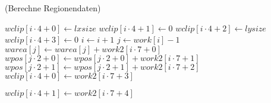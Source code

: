 \begin{algorithm}[ht]
\caption{ (Berechne Regionendaten)}
\label{alg:arlabeling-calcregiondata}
\begin{algorithmic}[1]
	\label{alg:arlabeling-calcregiondata-wclip-start}
		\State $\mathit{wclip}\left[i \cdot 4 + 0\right] \gets \mathit{lxsize}$
		\State $\mathit{wclip}\left[i \cdot 4 + 1\right] \gets 0$
		\State $\mathit{wclip}\left[i \cdot 4 + 2\right] \gets \mathit{lysize}$
		\State $\mathit{wclip}\left[i \cdot 4 + 3\right] \gets 0$
		\State $i \gets i + 1$
	\EndFor
	\label{alg:arlabeling-calcregiondata-wclip-end}
	\label{alg:arlabeling-calcregiondata-work-start}
		\State $j \gets \mathit{work}\left[i\right] - 1$
		\label{alg:arlabeling-calcregiondata-label}
		\State $\mathit{warea}\left[j\right] \gets \mathit{warea}\left[j\right] + \mathit{work2}\left[i \cdot 7 + 0\right]$
		\State $\mathit{wpos}\left[j \cdot 2 + 0\right] \gets \mathit{wpos}\left[j \cdot 2 + 0\right] + \mathit{work2}\left[i \cdot 7 + 1\right]$
		\label{alg:arlabeling-calcregiondata-sumx}
		\State $\mathit{wpos}\left[j \cdot 2 + 1\right] \gets \mathit{wpos}\left[j \cdot 2 + 1\right] + \mathit{work2}\left[i \cdot 7 + 2\right]$
		\label{alg:arlabeling-calcregiondata-sumy}
		\label{alg:arlabeling-calcregiondata-startx-start}
			\State $\mathit{wclip}\left[i \cdot 4 + 0\right] \gets \mathit{work2}\left[i \cdot 7 + 3\right]$
		\EndIf
		\label{alg:arlabeling-calcregiondata-startx-end}

		\label{alg:arlabeling-calcregiondata-endx-start}
			\State $\mathit{wclip}\left[i \cdot 4 + 1\right] \gets \mathit{work2}\left[i \cdot 7 + 4\right]$
		\EndIf
		\label{alg:arlabeling-calcregiondata-endx-end}


\end{algorithmic}
\end{algorithm}
